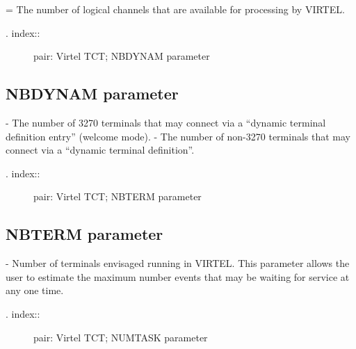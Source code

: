 \documentclass[letterpaper,10pt,english]{sphinxmanual}
\begin{document}
 = The number of logical channels that are available for processing by VIRTEL.
\begin{description}
\item[{. index::}] \leavevmode
pair: Virtel TCT; NBDYNAM parameter

\end{description}


\subsection{NBDYNAM parameter}
\label{\detokenize{Installation_Guide:nbdynam-parameter}}
\begin{sphinxVerbatim}[commandchars=\\\{\}]
 
\end{sphinxVerbatim}

 - The number of 3270 terminals that may connect via a “dynamic terminal definition entry” (welcome mode).
 - The number of non-3270 terminals that may connect via a “dynamic terminal definition”.
\begin{description}
\item[{. index::}] \leavevmode
pair: Virtel TCT; NBTERM parameter

\end{description}


\subsection{NBTERM parameter}
\label{\detokenize{Installation_Guide:nbterm-parameter}}
\begin{sphinxVerbatim}[commandchars=\\\{\}]
 
\end{sphinxVerbatim}

 - Number of terminals envisaged running in VIRTEL. This parameter allows the user to estimate the maximum number events that may be waiting for service at any one time.
\begin{description}
\item[{. index::}] \leavevmode
pair: Virtel TCT; NUMTASK parameter

\end{description}
\end{document}

